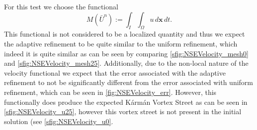 \begin{test} \label{tst:Velocity}
    For this test we choose the functional
    \begin{equation}
        M(\bar{U}^n) := \int_I\! \int_{\Omega}\! u\, d\mathbf{x}\, dt.
        \label{eq:VelocityFunctional}
    \end{equation}
    This functional is not considered to be a localized quantity and thus we
    expect the adaptive refinement to be quite similar to the uniform
    refinement, which indeed it is quite similar as can be seen by comparing
    \autoref{sfig:NSEVelocity_mesh0} and \autoref{sfig:NSEVelocity_mesh25}.
    Additionally, due to the non-local nature of the velocity functional
    we expect that the error associated with the adaptive refinement to
    not be significantly different from the error associated with
    uniform refinement, which can be seen in \autoref{fig:NSEVelocity_err}.
    However, this functionally does produce the expected K\'arm\'an Vortex
    Street as can be seen in \autoref{sfig:NSEVelocity_u25}, however this vortex
    street is not present in the initial solution (see
    \autoref{sfig:NSEVelocity_u0}.


\end{test}
